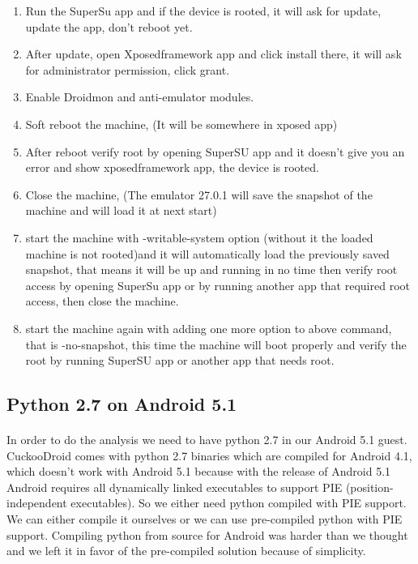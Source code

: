 \documentclass[../main.tex]{subfile}
\begin{document}
\begin{enumerate}
		\item Run the SuperSu app and if the device is rooted, it will ask for update, update the app, don't reboot yet.
		\item After update, open Xposedframework app and click install there, it will ask for administrator permission, click grant.
		\item Enable Droidmon and anti-emulator modules.
		\item Soft reboot the machine, (It will be somewhere in xposed app)
		\item After reboot verify root by opening SuperSU app and it doesn't give you an error and show xposedframework app, the device is rooted.
		\item Close the machine, (The emulator 27.0.1 will save the snapshot of the machine and will load it at next start)
		\item start the machine with -writable-system option (without it the loaded machine is not rooted)and it will automatically load the previously saved snapshot, that means it will be up and running in no time then verify root access by opening SuperSu app or by running another app that required root access, then close the machine.
		\item start the machine again with adding one more option to above command, that is -no-snapshot, this time the machine will boot properly and verify the root by running SuperSU app or another app that needs root.
					
		\end{enumerate}
		\subsection{Python 2.7 on Android 5.1} \label{sec:android_5.1_python}
		\paragraph{} In order to do the analysis we need to have python 2.7 in our Android 5.1 guest. CuckooDroid comes with python 2.7 binaries which are compiled for Android 4.1, which doesn't work with Android 5.1 because with the release of Android 5.1 Android requires all dynamically linked executables to support PIE (position-independent executables). So we either need python compiled with PIE support. We can either compile it ourselves or we can use pre-compiled python with PIE support. Compiling python from source for Android was harder than we thought and we left it in favor of the pre-compiled solution because of simplicity. 
		
\end{document}
